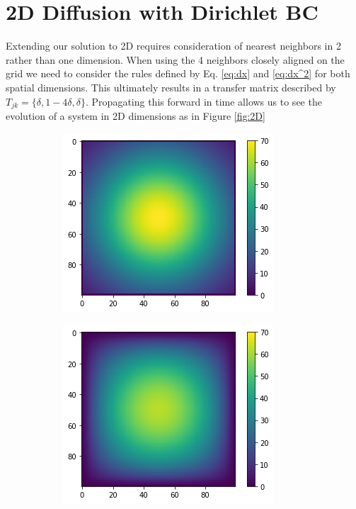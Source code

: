 \documentclass[]{article}
\begin{document}
\section{2D Diffusion with Dirichlet BC}
Extending our solution to 2D requires consideration of nearest neighbors in 2 rather than one dimension.  When using the 4 neighbors closely aligned on the grid we need to consider the rules defined by Eq. \ref{eq:dx} and \ref{eq:dx^2} for both spatial dimensions. This ultimately results in a transfer matrix described by $T_{jk} = \{\delta,1-4\delta,\delta\}$. Propagating this forward in time allows us to see the evolution of a system in 2D dimensions as in Figure \ref{fig:2D}
\begin{figure}
	\begin{subfigure}{.5\textwidth}
		\centering
		\includegraphics[width=.8\linewidth]{figures/2D_Diffusion_DirBound0_init.png}
		\caption{}
	\end{subfigure}%
	\begin{subfigure}{.5\textwidth}
		\centering
		\includegraphics[width=.8\linewidth]{figures/2D_Diffusion_DirBound0_end.png}

\end{subfigure}
\end{figure}
\end{document}
